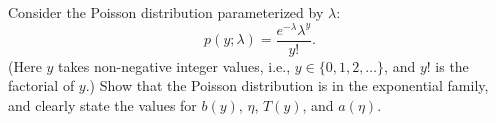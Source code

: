 \item {} Consider the Poisson distribution parameterized by
$\lambda$:
%
\begin{equation*}
  p(y; \lambda) = \frac{e^{-\lambda}\lambda^y}{y!}.
\end{equation*}
%
(Here $y$ takes non-negative integer values, i.e., $y \in \{0, 1, 2, \ldots\}$, and $y!$ is the factorial of $y$.) 
Show that the Poisson distribution is in the exponential family, and
clearly state the values for $b(y)$, $\eta$, $T(y)$, and $a(\eta)$.
